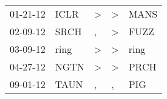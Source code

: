\begin{supertabular}{lllll}
 01-21-12 &  ICLR &  \textgreater &  \textgreater &  MANS \\
 02-09-12 &  SRCH &             , &  \textgreater &  FUZZ \\
 03-09-12 &  ring &  \textgreater &  \textgreater &  ring \\
 04-27-12 &  NGTN &  \textgreater &  \textgreater &  PRCH \\
 09-01-12 &  TAUN &             , &             , &   PIG \\
\end{supertabular}

